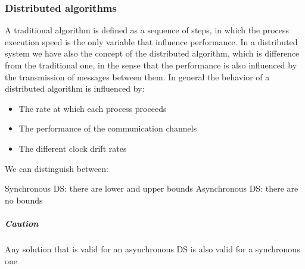     \subsubsection{Distributed algorithms}
    A traditional algorithm is defined as a sequence of steps, in which the process
    execution speed is the only variable that influence performance. In a distributed
    system we have also the concept of the distributed algorithm, which is difference 
    from the traditional one, in the sense that the performance is also influenced by 
    the transmission of messages between them. In general the behavior of a distributed
    algorithm is influenced by:
    \begin{itemize}
        \item The rate at which each process proceeds
        \item The performance of the communication channels
        \item The different clock drift rates
    \end{itemize}
    We can distinguish between:
    \begin{itemize}
        Synchronous DS: there are lower and upper bounds
        Asynchronous DS: there are no bounds
    \end{itemize}
    \subparagraph{Caution}
    Any solution that is valid for an asynchronous DS is also valid for a synchronous one